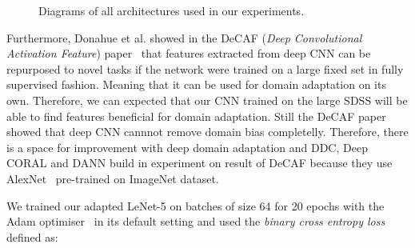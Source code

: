 \begin{figure}
\begin{center}
{
\label{drcn_architecture}
}
\end{center}
\caption[Architectures of deep domain adaptation model from experiments]{
	Diagrams of all architectures used in our experiments.
	}
\end{figure}

Furthermore, Donahue et al. showed in the DeCAF (\textit{Deep Convolutional Activation Feature}) paper~\cite{donahue2014}
that features extracted from deep CNN can be repurposed to novel tasks
if the network were trained on a large fixed set in fully supervised fashion.
Meaning that it can be used for domain adaptation on its own.
Therefore, we can expected that our CNN trained on the large SDSS
will be able to find features beneficial for domain adaptation.
Still the DeCAF paper showed that
deep CNN cannnot remove domain bias completelly.
Therefore, there is a space for improvement with deep domain adaptation
and DDC, Deep CORAL and DANN build in experiment on result of DeCAF
because they use AlexNet~\cite{krizhevsky2012} pre-trained on ImageNet dataset.

We trained our adapted LeNet-5 on batches of size 64 for 20 epochs
with the Adam optimiser~\cite{kingma2014} in its default setting
and used the \textit{binary cross entropy loss} defined as:

